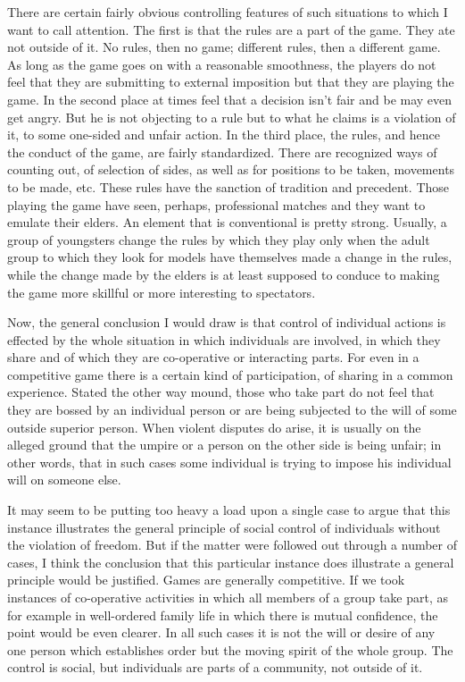 There are certain fairly obvious controlling features of such situations to which I want 
to call attention. The first is that the rules are a part of the game. They ate not outside of 
it. No rules, then no game; different rules, then a different game. As long as the game 
goes on with a reasonable smoothness, the players do not feel that they are submitting to 
external imposition but that they are playing the game. In the second place at times feel 
that a decision isn't fair and be may even get angry. But he is not objecting to a rule but to 
what he claims is a violation of it, to some one-sided and unfair action. In the third place, 
the rules, and hence the conduct of the game, are fairly standardized. There are 
recognized ways of counting out, of selection of sides, as well as for positions to be 
taken, movements to be made, etc. These rules have the sanction of tradition and 
precedent. Those playing the game have seen, perhaps, professional matches and they 
want to emulate their elders. An element that is conventional is pretty strong. Usually, a 
group of youngsters change the rules by which they play only when the adult group to 
which they look for models have themselves made a change in the rules, while the change 
made by the elders is at least supposed to conduce to making the game more skillful or 
more interesting to spectators. 

Now, the general conclusion I would draw is that control of individual actions is 
effected by the whole situation in which individuals are involved, in which they share and 
of which they are co-operative or interacting parts. For even in a competitive game there 
is a certain kind of participation, of sharing in a common experience. Stated the other 
way mound, those who take part do not feel that they are bossed by an individual person 
or are being subjected to the will of some outside superior person. When violent disputes 
do arise, it is usually on the alleged ground that the umpire or a person on the other side is 
being unfair; in other words, that in such cases some individual is trying to impose his 
individual will on someone else. 

It may seem to be putting too heavy a load upon a single case to argue that this 
instance illustrates the general principle of social control of individuals without the 
violation of freedom. But if the matter were followed out through a number of cases, I 
think the conclusion that this particular instance does illustrate a general principle would 
be justified. Games are generally competitive. If we took instances of co-operative 
activities in which all members of a group take part, as for example in well-ordered 
family life in which there is mutual confidence, the point would be even clearer. In all 
such cases it is not the will or desire of any one person which establishes order but the 
moving spirit of the whole group. The control is social, but individuals are parts of a 
community, not outside of it. 

